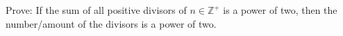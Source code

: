 Prove: If the sum of all positive divisors of $ n \in \mathbb{Z}^{+}$ is a power of two, then the number/amount of the divisors is a power of two.